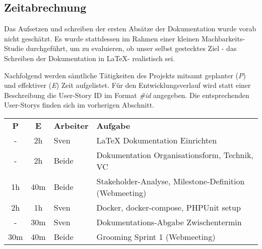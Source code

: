 \subsection{Zeitabrechnung}
Das Aufsetzen und schreiben der ersten Absätze der Dokumentation wurde vorab nicht geschätzt. Es wurde stattdessen im Rahmen einer kleinen Machbarkeits-Studie durchgeführt, um zu evaluieren, ob unser selbst gestecktes Ziel - das Schreiben der Dokumentation in \LaTeX - realistisch sei.

Nachfolgend werden sämtliche Tätigkeiten des Projekts mitsamt geplanter (\emph{P}) und effektiver (\emph{E}) Zeit aufgelistet. Für den Entwicklungsverlauf wird statt einer Beschreibung die User-Story ID im Format \emph{\#id} angegeben. Die entsprechenden User-Storys finden sich im vorherigen Abschnitt.

\vspace{5mm}

\begin{tabular}{ c c l l }
  \textbf{P} & \textbf{E} & \textbf{Arbeiter} & \textbf{Aufgabe} \\
  - & 2h & Sven & LaTeX Dokumentation Einrichten \\
  - & 2h & Beide & Dokumentation Organisationsform, Technik, VC\\
  1h & 40m & Beide & Stakeholder-Analyse, Milestone-Definition (Webmeeting) \\
  2h & 1h & Sven & Docker, docker-compose, PHPUnit setup \\
  - & 30m & Sven & Dokumentations-Abgabe Zwischentermin \\ 
  30m & 40m & Beide & Grooming Sprint 1 (Webmeeting) \\
\end{tabular}
